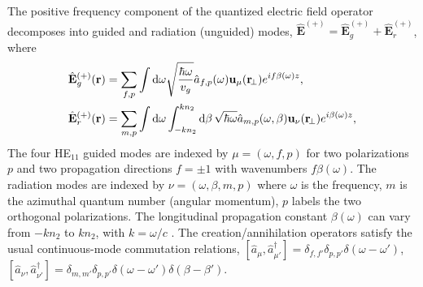 \documentclass[preprint,aps,pra,onecolumn]{revtex4-1} %
\newcommand{\awg}{\hat{a}_{f,p}(\omega)}
\newcommand{\awr}{\hat{a}_{m,p}(\omega,\beta)}
\begin{document}
The positive frequency component of the quantized electric field operator decomposes into guided and radiation (unguided) modes, $\hat{\mathbf{E}}^{(+)}=\hat{\mathbf{E}}_g^{(+)}+\hat{\mathbf{E}}_{r}^{(+)}$, where
	\begin{align}
		\hat{\mathbf{E}}_g^{(+)}(\br) &= \sum_{f,p} \int \mathrm{d}\omega  \sqrt{\frac{ \hbar \omega}{ v_g}} \awg \mathbf{u}_\mu (\br\!_\perp) e^{i f\beta(\omega) z } ,\label{Eq::QuantizedElectricField} \\
		\hat{\mathbf{E}}_r^{(+)}(\br) &= \sum_{m,p} \int \mathrm{d}\omega   \int_{-kn_2}^{kn_2}\mathrm{d}\beta \, \sqrt{ \hbar \omega}\awr \mathbf{u}_\nu (\br\!_\perp) e^{i\beta(\omega) z },
	\end{align}
The four HE$_{11}$ guided modes are indexed by $\mu =(\omega, f, p)$ for two polarizations $p$ and two propagation directions $f=\pm1$ with wavenumbers $f\beta (\omega)$.  The radiation modes are indexed by  $\nu=(\omega, \beta, m, p)$ where $\omega$ is the frequency, $m$ is the azimuthal quantum number (angular momentum), $p$ labels the two orthogonal polarizations. The longitudinal propagation constant $\beta(\omega)$ can vary from $-kn_2$ to $kn_2$, with $k = \omega/c$ \cite{sondergaard_general_2001,le_kien_spontaneous_2005}.  The creation/annihilation operators satisfy the usual continuous-mode commutation relations, $[\hat{a}_\mu, \hat{a}^\dag_{\mu'} ] = \delta_{f,f'} \delta_{p,p'} \delta ( \omega - \omega ') $, $[\hat{a}_\nu ,\hat{a}^\dag_{\nu'} ] = \delta_{m,m'} \delta_{p,p'} \delta ( \omega - \omega ')  \delta ( \beta - \beta') $.
\end{document}
